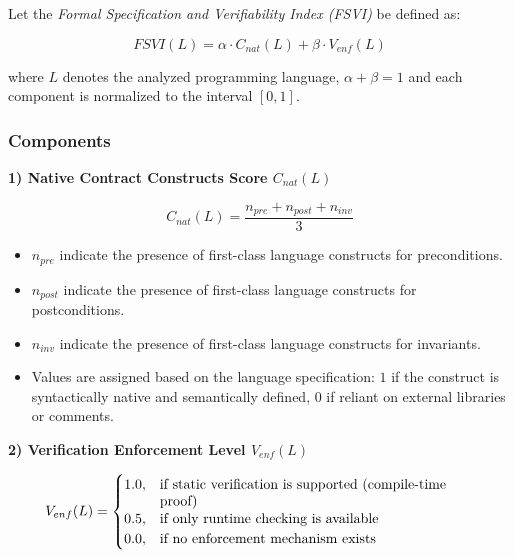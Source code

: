 Let the \textit{Formal Specification and Verifiability Index (FSVI)} be defined as:

\[
    FSVI(L) = 
    \alpha \cdot C_{nat}(L) + 
    \beta \cdot V_{enf}(L)
\]

where $L$ denotes the analyzed programming language, $\alpha + \beta = 1$ and each component is normalized to the interval $[0,1]$.

\subsubsection{Components}

\textbf{1) Native Contract Constructs Score $C_{nat}(L)$}

\[
C_{nat}(L) = \frac{n_{pre} + n_{post} + n_{inv}}{3}
\]

\begin{itemize}
    \item $n_{pre}$ indicate the presence of first-class language constructs for preconditions.
    \item $n_{post}$ indicate the presence of first-class language constructs for postconditions.
    \item $n_{inv}$ indicate the presence of first-class language constructs for invariants.
    \item Values are assigned based on the language specification: $1$ if the construct is syntactically native and semantically defined, $0$ if reliant on external libraries or comments.
\end{itemize}

\textbf{2) Verification Enforcement Level $V_{enf}(L)$}

\[
V_{enf}(L) = 
\begin{cases} 
    1.0, & \text{\parbox[t]{0.65\linewidth}{\raggedright
            if static verification is supported (compile-time proof)%
         }} \\
    0.5, & \text{\parbox[t]{0.65\linewidth}{\raggedright
            if only runtime checking is available%
         }} \\
    0.0, & \text{\parbox[t]{0.65\linewidth}{\raggedright
            if no enforcement mechanism exists%
         }}
\end{cases}
\]
